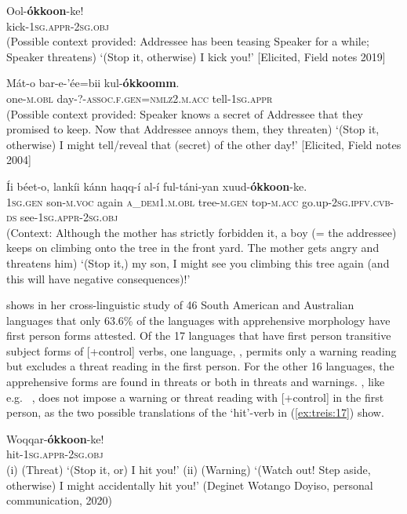 \documentclass[output=paper,colorlinks,citecolor=brown,]{langscibook}
\begin{document}
\ea\label{ex:treis:14} 
\gll Ool-\textbf{ókkoon}-ke! \\
kick-\textsc{1sg.appr-2sg.obj}\\
\glt (Possible context provided: Addressee has been teasing Speaker for a while; Speaker threatens) `(Stop it, otherwise) I kick you!' [Elicited, Field notes 2019]
\z 

\ea\label{ex:treis:15} 
\gll Mát-o 		bar-e-'ée=bii 					kul-\textbf{ókkoomm}. \\
one-\textsc{m.obl}	day-?-\textsc{assoc.f.gen=nmlz2.m.acc} tell-\textsc{1sg.appr}\\
\glt (Possible context provided: Speaker knows a secret of Addressee that they promised to keep. Now that Addressee annoys them, they threaten) `(Stop it, otherwise) I might tell/reveal that (secret) of the other day!'  [Elicited, Field notes 2004]
\z 

\ea\label{ex:treis:16} 
\gll Íi			béet-o,		lankíi	kánn					haqq-í			al-í ful-táni-yan			xuud-\textbf{ókkoon}-ke. \\
\textsc{1sg.gen} son-\textsc{m.voc}	again	\textsc{a\_dem1.m.obl}	tree-\textsc{m.gen}	top-\textsc{m.acc} go.up-\textsc{2sg.ipfv.cvb-ds} see-\textsc{1sg.appr-2sg.obj}\\
\glt (Context: Although the mother has strictly forbidden it, a boy (= the addressee) keeps on climbing onto the tree in the front yard. The mother gets angry and threatens him) `(Stop it,) my son, I might see you climbing this tree again (and this will have negative consequences)!'  \citep[4.45]{KEB1989}
\z

\citet{vuillermet2018a} shows in her cross-linguistic study of 46 South American and Australian languages that only 63.6\% of the languages with apprehensive morphology have first person forms attested. Of the 17 languages that have first person transitive subject forms of [+control] verbs, one language, , permits only a warning reading but excludes a threat reading in the first person. For the other 16 languages, the apprehensive forms are found in threats or both in threats and warnings. , like  e.g.\  \citep[273--274]{vuillermet2018a}, does not impose a warning or threat reading with [+control] in the first person, as the two possible translations of the `hit'-verb in (\ref{ex:treis:17}) show.

\ea\label{ex:treis:17} 
\gll Woqqar-\textbf{ókkoon}-ke! \\
hit-\textsc{1sg.appr-2sg.obj}\\
\glt (i)	(Threat) `(Stop it, or) I  hit you!' \newline
(ii)	(Warning) `(Watch out! Step aside, otherwise) I might accidentally hit you!' (Deginet Wotango Doyiso, personal communication, 2020)
\z
\end{document}
